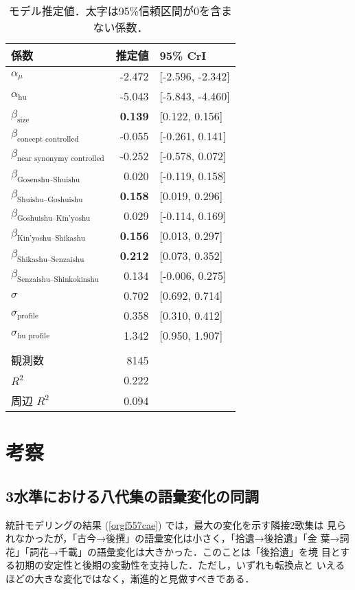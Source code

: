 \documentclass[submit]{ipsj}
\renewcommand{\ref}{\cref}
\begin{document}
\begin{table}[t]
\caption{\label{tab:org39ff028}モデル推定値．太字は95\%信頼区間が0を含まない係数．}
\centering
\begin{tabular}{lrl}
係数 & 推定値 & 95\% CrI\\
\hline
\(\alpha_{\mu}\) & -2.472 & {[}-2.596, -2.342]\\
\(\alpha_{\text{hu}}\) & -5.043 & {[}-5.843, -4.460]\\
\(\beta_{\text{size}}\) & \textbf{0.139} & {[}0.122, 0.156]\\
\(\beta_{\text{concept controlled}}\) & -0.055 & {[}-0.261, 0.141]\\
\(\beta_{\text{near synonymy controlled}}\) & -0.252 & {[}-0.578, 0.072]\\
\(\beta_{\text{Gosenshu--Shuishu}}\) & 0.020 & {[}-0.119, 0.158]\\
\(\beta_{\text{Shuishu--Goshuishu}}\) & \textbf{0.158} & {[}0.019, 0.296]\\
\(\beta_{\text{Goshuishu--Kin'yoshu}}\) & 0.029 & {[}-0.114, 0.169]\\
\(\beta_{\text{Kin'yoshu--Shikashu}}\) & \textbf{0.156} & {[}0.013, 0.297]\\
\(\beta_{\text{Shikashu--Senzaishu}}\) & \textbf{0.212} & {[}0.073, 0.352]\\
\(\beta_{\text{Senzaishu--Shinkokinshu}}\) & 0.134 & {[}-0.006, 0.275]\\
\(\sigma\) & 0.702 & {[}0.692, 0.714]\\
\(\sigma_{\text{profile}}\) & 0.358 & {[}0.310, 0.412]\\
\(\sigma_{\text{hu profile}}\) & 1.342 & {[}0.950, 1.907]\\
 &  & \\
観測数 & 8145 & \\
\(R^2\) & 0.222 & \\
周辺 \(R^2\) & 0.094 & \\
\end{tabular}
\end{table}
\section{考察\label{org883ad76}}
\label{sec:orgec61c26}
\subsection{3水準における八代集の語彙変化の同調\label{org4ba04bd}}
\label{sec:orgec7b698}
統計モデリングの結果 (\ref{orgf557cae}) では，最大の変化を示す隣接2歌集は
見られなかったが，「古今→後撰」の語彙変化は小さく，「拾遺→後拾遺」「金
葉→詞花」「詞花→千載」の語彙変化は大きかった．このことは「後拾遺」を境
目とする初期の安定性と後期の変動性を支持した．ただし，いずれも転換点と
いえるほどの大きな変化ではなく，漸進的と見做すべきである．
\end{document}
